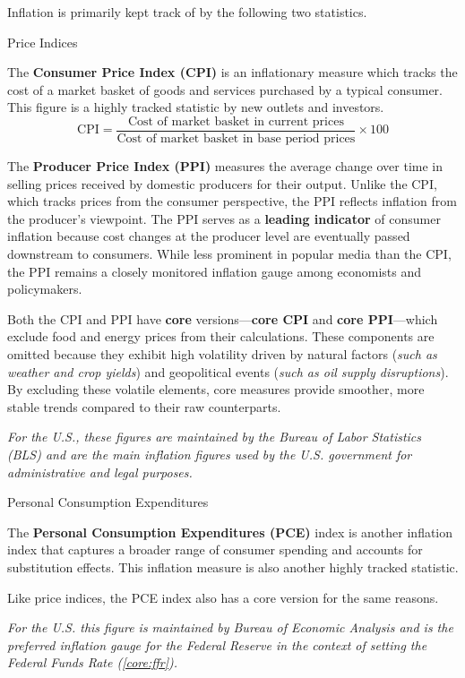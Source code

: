 \documentclass[10pt]{article}
\begin{document}
    Inflation is primarily kept track of by the following two statistics.

    \begin{core}[label=core:price_indices]{Price Indices}

      The \textbf{Consumer Price Index (CPI)} is an inflationary measure which tracks the cost of a market basket of goods and services purchased by a typical consumer. This figure is a highly tracked statistic by new outlets and investors.
      \[
        \text{CPI} = \frac{\text{Cost of market basket in current prices}}{\text{Cost of market basket in base period prices}} \times 100
      \]

      The \textbf{Producer Price Index (PPI)} measures the average change over time in selling prices received by domestic producers for their output. Unlike the CPI, which tracks prices from the consumer perspective, the PPI reflects inflation from the producer's viewpoint. The PPI serves as a \textbf{leading indicator} of consumer inflation because cost changes at the producer level are eventually passed downstream to consumers. While less prominent in popular media than the CPI, the PPI remains a closely monitored inflation gauge among economists and policymakers.

      Both the CPI and PPI have \textbf{core} versions---\textbf{core CPI} and \textbf{core PPI}---which exclude food and energy prices from their calculations. These components are omitted because they exhibit high volatility driven by natural factors (\textit{such as weather and crop yields}) and geopolitical events (\textit{such as oil supply disruptions}). By excluding these volatile elements, core measures provide smoother, more stable trends compared to their raw counterparts.

      \textit{For the U.S., these figures are maintained by the Bureau of Labor Statistics (BLS) and are the main inflation figures used by the U.S. government for administrative and legal purposes.}

    \end{core}

    \begin{core}{Personal Consumption Expenditures}

      The \textbf{Personal Consumption Expenditures (PCE)} index is another inflation index that captures a broader range of consumer spending and accounts for substitution effects. This inflation measure is also another highly tracked statistic.

      Like price indices, the PCE index also has a core version for the same reasons.

      \textit{For the U.S. this figure is maintained by Bureau of Economic Analysis and is the preferred inflation gauge for the Federal Reserve in the context of setting the Federal Funds Rate (\textit{\autoref{core:ffr}}).}

    \end{core}
\end{document}
